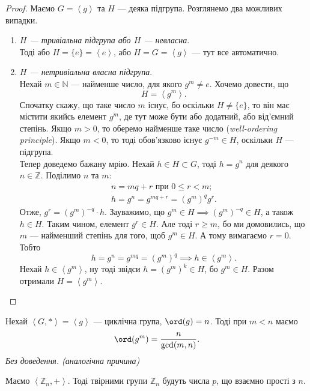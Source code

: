 \documentclass{math_library}
\begin{document}
\begin{proof}
Маємо $G = \left<g\right>$ та $H$ --- деяка підгрупа. Розглянемо два можливих випадки.
\begin{enumerate}[wide=0pt,label={\Roman*.}]
\item \textit{$H$ --- тривіальна підгрупа або $H$ --- невласна}. \\
Тоді або $H = \{e\} = \left<e\right>$, або $H = G = \left<g\right>$ --- тут все автоматично.

\item \textit{$H$ --- нетривіальна власна підгрупа}.\\
Нехай $m \in \mathbb{N}$ --- найменше число, для якого $g^m \neq e$. Хочемо довести, що
\[
H = \left< g^m \right>.
\]
Спочатку скажу, що таке число $m$ існує, бо оскільки $H \neq \{e\}$, то він має містити якийсь елемент $g^m$, де тут може бути або додатний, або від'ємний степінь. Якщо $m > 0$, то оберемо найменше таке число (\textit{well-ordering principle}). Якщо $m < 0$, то тоді обов'язково існує $g^{-m} \in H$, оскільки $H$ --- підгрупа.
\bigskip \\
Тепер доведемо бажану мрію. Нехай $h \in H \subset G$, тоді $h = g^n$ для деякого $n \in \mathbb{Z}$. Поділимо $n$ та $m$:
\begin{align*}
n = mq + r \text{ при } 0 \leq r < m;\\
h = g^n = g^{mq+r} = (g^m)^q g^r.
\end{align*}
Отже, $g^r = (g^m)^{-q} \cdot h$. Зауважимо, що $g^m \in H \implies (g^m)^{-q} \in H$, а також $h \in H$. Таким чином, елемент $g^r \in H$. Але тоді $r \geq m$, бо ми домовились, що $m$ --- найменший степінь для того, щоб $g^m \in H$. А тому вимагаємо $r = 0$. Тобто \[
h = g^n = g^{mq} = (g^m)^q \implies h \in \left<g^m\right>. 
\]
Нехай $h \in \left<g^m\right>$, ну тоді звідси $h = (g^m)^k \in H$, бо $g^m \in H$.
Разом отримали $H = \left<g^m\right>$. \qedhere
\end{enumerate}
\end{proof}

\begin{proposition}
\label{ord_g_to_some_power}
Нехай $\left< G, * \right> = \left<g\right>$ --- циклічна група, $\ord (g) = n$. Тоді при $m < n$ маємо
\begin{align*}
\ord (g^m) =  \dfrac{n}{\gcd(m,n)}.
\end{align*}
\textit{Без доведення. (аналогічна причина)}
\end{proposition}

\begin{example}
Маємо $\left< \mathbb{Z}_n, + \right>$. Тоді твірними групи $\mathbb{Z}_n$ будуть числа $p$, що взаємно прості з $n$.
\end{example}
\end{document}

